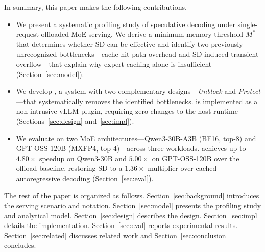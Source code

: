 In summary, this paper makes the following contributions.
\begin{itemize}[leftmargin=1.2em]
\item We present a systematic profiling study of speculative decoding under single-request offloaded MoE serving. We derive a minimum memory threshold $M^*$ that determines whether SD can be effective and identify two previously unrecognized bottlenecks---cache-hit path overhead and SD-induced transient overflow---that explain why expert caching alone is insufficient (Section~\ref{sec:model}).

\item We develop \sysname, a system with two complementary designs---\emph{Unblock} and \emph{Protect}---that systematically removes the identified bottlenecks. \sysname is implemented as a non-intrusive vLLM plugin, requiring zero changes to the host runtime (Sections~\ref{sec:design} and~\ref{sec:impl}).

\item We evaluate \sysname on two MoE architectures---Qwen3-30B-A3B (BF16, top-8) and GPT-OSS-120B (MXFP4, top-4)---across three workloads. \sysname achieves up to $4.80\times$ speedup on Qwen3-30B and $5.00\times$ on GPT-OSS-120B over the offload baseline, restoring SD to a $1.36\times$ multiplier over cached autoregressive decoding (Section~\ref{sec:eval}).
\end{itemize}

The rest of the paper is organized as follows. Section~\ref{sec:background} introduces the serving scenario and notation. Section~\ref{sec:model} presents the profiling study and analytical model. Section~\ref{sec:design} describes the \sysname design. Section~\ref{sec:impl} details the implementation. Section~\ref{sec:eval} reports experimental results. Section~\ref{sec:related} discusses related work and Section~\ref{sec:conclusion} concludes.

